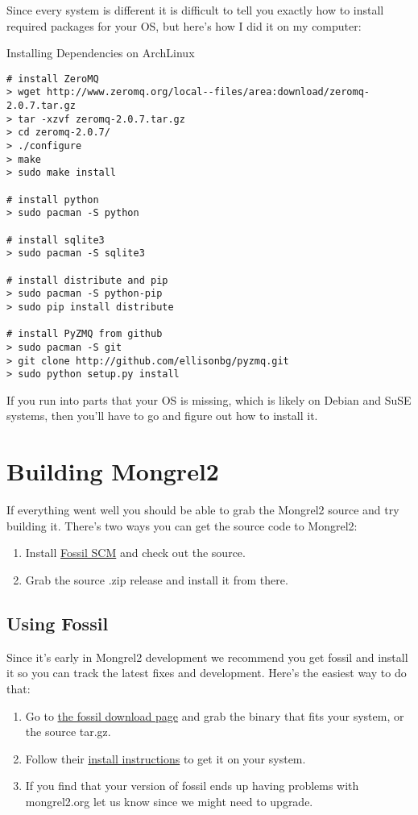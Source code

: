 Since every system is different it is difficult to tell you exactly how to
install required packages for your OS, but here's how I did it on my computer:


\begin{code}{Installing Dependencies on ArchLinux}
\begin{verbatim}
# install ZeroMQ
> wget http://www.zeromq.org/local--files/area:download/zeromq-2.0.7.tar.gz
> tar -xzvf zeromq-2.0.7.tar.gz
> cd zeromq-2.0.7/
> ./configure
> make
> sudo make install

# install python
> sudo pacman -S python

# install sqlite3
> sudo pacman -S sqlite3

# install distribute and pip
> sudo pacman -S python-pip
> sudo pip install distribute

# install PyZMQ from github
> sudo pacman -S git
> git clone http://github.com/ellisonbg/pyzmq.git
> sudo python setup.py install
\end{verbatim}
\end{code}

If you run into parts that your OS is missing, which is likely on
Debian and SuSE systems, then you'll have to go and figure out 
how to install it.


\section{Building Mongrel2}

If everything went well you should be able to grab the Mongrel2 source
and try building it.  There's two ways you can get the source code to
Mongrel2:

\begin{enumerate}
\item Install \href{http://fossil-scm.org}{Fossil SCM} and check out the source.
\item Grab the source .zip release and install it from there.
\end{enumerate}

\subsection{Using Fossil}

Since it's early in Mongrel2 development we recommend you get fossil and install it
so you can track the latest fixes and development.  Here's the easiest way to
do that:

\begin{enumerate}
\item Go to \href{http://www.fossil-scm.org/download.html}{the fossil download page} and
    grab the binary that fits your system, or the source tar.gz.
\item Follow their \href{http://fossil-scm.org/index.html/doc/tip/www/build.wiki}{install instructions}
    to get it on your system.
\item If you find that your version of fossil ends up having problems with mongrel2.org let us know since
    we might need to upgrade.
\end{enumerate}

